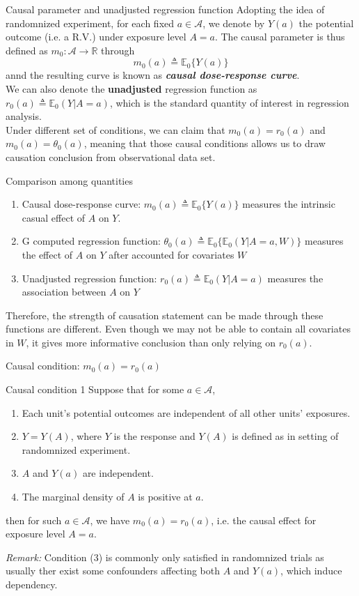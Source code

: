 \documentclass{beamer}
\newcommand{\defn}{\triangleq}
\newcommand{\E}{\mathbb{E}}
\newcommand{\R}{\mathbb{R}}
\begin{document}
\begin{frame}{Causal parameter and unadjusted regression function}
Adopting the idea of randomnized experiment, for each fixed $a\in\mathcal{A}$, we denote by $Y(a)$ the potential outcome (i.e. a R.V.) under exposure level $A=a$. The causal parameter is thus defined as $m_0:\mathcal{A}\to\R$ through
$$
m_0(a)\defn \E_0\big\{Y(a)\big\}
$$
annd the resulting curve is known as \textbf{\textit{causal dose-response curve}}.\\
We can also denote the \textbf{unadjusted} regression function as $r_0(a)\defn\E_0(Y|A=a)$, which is the standard quantity of interest in regression analysis.\\
Under different set of conditions, we can claim that $m_0(a)=r_0(a)$ and $m_0(a)=\theta_0(a)$, meaning that those causal conditions allows us to draw causation conclusion from observational data set.
\end{frame}

\begin{frame}{Comparison among quantities}
\begin{enumerate}
	\item Causal dose-response curve: $m_0(a)\defn \E_0\big\{Y(a)\big\}$ measures the intrinsic casual effect of $A$ on $Y$.
	\item G computed regression function: $\theta_0(a)\defn \E_0\big\{\E_0(Y|A=a,W) \big\}$ measures the effect of $A$ on $Y$ after accounted for covariates $W$
	\item Unadjusted regression function: $r_0(a)\defn\E_0(Y|A=a)$ measures the association between $A$ on $Y$
\end{enumerate}
Therefore, the strength of causation statement can be made through these functions are different. Even though we may not be able to contain all covariates in $W$, it gives more informative conclusion than only relying on $r_0(a)$.
\end{frame}

\begin{frame}{Causal condition: $m_0(a)=r_0(a)$}
\begin{block}{Causal condition 1}
	Suppose that for some $a\in \mathcal{A}$,
	\begin{enumerate}
		\item Each unit's potential outcomes are independent of all other units' exposures.

		\item $Y=Y(A)$, where $Y$ is the response and $Y(A)$ is defined as in setting of randomnized experiment.

		\item $A$ and $Y(a)$ are independent.

		\item The marginal density of $A$ is positive at $a$.
	\end{enumerate}
    then for such $a\in \mathcal{A}$, we have $m_0(a)=r_0(a)$, i.e. the causal effect for exposure level $A=a$.
\end{block}
\textit{
Remark:
} Condition (3) is commonly only satisfied in randomnized trials as usually ther exist some confounders affecting both $A$ and $Y(a)$, which induce dependency.
\end{frame}
\end{document}
